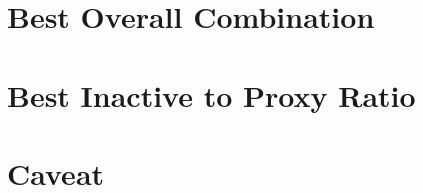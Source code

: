 \section{Best Overall Combination}\label{sec:best-overall-combination}


\section{Best Inactive to Proxy Ratio}\label{sec:best-inactive-to-proxy-count}


\section{Caveat}\label{sec:caveat}


